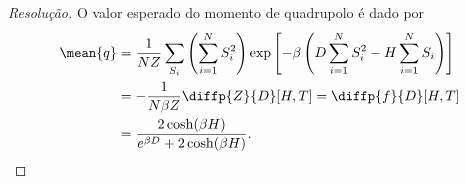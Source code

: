 \begin{proof}[Resolução]
    O valor esperado do momento de quadrupolo é dado por
    \begin{align*}
        \mean{q} &= \frac{1}{NZ} \sum_{S_i} \left(\sum_{i=1}^N S_i^2\right) \exp\left[-\beta\left(D \sum_{i=1}^N S_i^2 - H\sum_{i=1}^N S_i\right)\right]\\
                 &= -\frac{1}{N \beta Z} \diffp{Z}{D}[H,T] = \diffp{f}{D}[H,T]\\
                 &= \frac{2 \cosh(\beta H)}{e^{\beta D} + 2\cosh(\beta H)}.
    \end{align*}
\end{proof}
